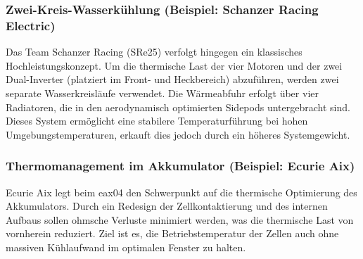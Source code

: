 \subsubsection{Zwei-Kreis-Wasserkühlung (Beispiel: Schanzer Racing Electric)}
Das Team Schanzer Racing (SRe25) verfolgt hingegen ein klassisches Hochleistungskonzept. Um die thermische Last der vier Motoren und der zwei Dual-Inverter (platziert im Front- und Heckbereich) abzuführen, werden zwei separate Wasserkreisläufe verwendet. Die Wärmeabfuhr erfolgt über vier Radiatoren, die in den aerodynamisch optimierten Sidepods untergebracht sind. Dieses System ermöglicht eine stabilere Temperaturführung bei hohen Umgebungstemperaturen, erkauft dies jedoch durch ein höheres Systemgewicht.

\subsubsection{Thermomanagement im Akkumulator (Beispiel: Ecurie Aix)}
Ecurie Aix legt beim eax04 den Schwerpunkt auf die thermische Optimierung des Akkumulators. Durch ein Redesign der Zellkontaktierung und des internen Aufbaus sollen ohmsche Verluste minimiert werden, was die thermische Last von vornherein reduziert. Ziel ist es, die Betriebstemperatur der Zellen auch ohne massiven Kühlaufwand im optimalen Fenster zu halten.